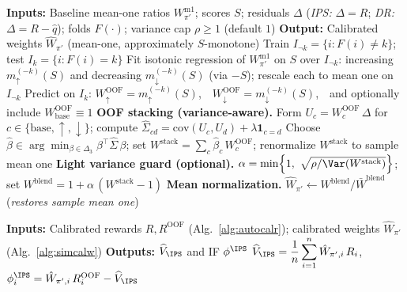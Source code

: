 \begin{algorithm}[t]
\caption{\textsc{Weight-Stabilization}: surrogate-indexed, unit-mean monotone calibration (OOF project $\to$ stack $\to$ cap $\to$ normalize)}
\label{alg:simcalw}
\begin{algorithmic}[1]
\STATE \textbf{Inputs:} Baseline mean-one ratios $W^{\mathrm{m1}}_{\pi'}$; scores $S$; residuals $\Delta$ (\emph{IPS:} $\Delta{=}R$; \emph{DR:} $\Delta{=}R-\hat q$); folds $F(\cdot)$; variance cap $\rho\!\ge\!1$ (default $1$)
\STATE \textbf{Output:} Calibrated weights $\hat W_{\pi'}$ (mean-one, approximately $S$-monotone)
  \STATE Train $I_{\neg k}=\{i:F(i)\neq k\}$; test $I_k=\{i:F(i)=k\}$ 
  \STATE Fit isotonic regression of $W^{\mathrm{m1}}_{\pi'}$ on $S$ over $I_{\neg k}$: increasing $m^{(-k)}_{\uparrow}(S)$ and decreasing $m^{(-k)}_{\downarrow}(S)$ (via $-S$); rescale each to mean one on $I_{\neg k}$
  \STATE Predict on $I_k$: $W^{\mathrm{OOF}}_{\uparrow}=m^{(-k)}_{\uparrow}(S)$,\ \ $W^{\mathrm{OOF}}_{\downarrow}=m^{(-k)}_{\downarrow}(S)$,\ \ and optionally include $W^{\mathrm{OOF}}_{\mathrm{base}}\equiv 1$
\ENDFOR
\STATE \textbf{OOF stacking (variance-aware).} Form $U_c=W^{\mathrm{OOF}}_c\,\Delta$ for $c\in\{\mathrm{base},\uparrow,\downarrow\}$; compute $\hat\Sigma_{cd}=\mathrm{cov}(U_c,U_d)+\lambda \mathbf{1}_{c=d}$
\STATE Choose $\hat\beta\in \arg\min_{\beta\in\Delta_3}\beta^\top \hat\Sigma\,\beta$; set $W^{\mathrm{stack}}=\sum_c \hat\beta_c\,W^{\mathrm{OOF}}_c$; renormalize $W^{\mathrm{stack}}$ to sample mean one
\STATE \textbf{Light variance guard (optional).} $\alpha = \min\!\left\{1,\ \sqrt{\rho/\Var(W^{\mathrm{stack}})}\right\}$; set $W^{\mathrm{blend}}=1+\alpha\,(W^{\mathrm{stack}}-1)$
\STATE \textbf{Mean normalization.} $\hat W_{\pi'} \leftarrow W^{\mathrm{blend}}/\bar W^{\mathrm{blend}}$ \hfill(\emph{restores sample mean one})
\end{algorithmic}
\end{algorithm}

\begin{algorithm}[t]
\caption{\textsc{Cal-IPS}: calibrated importance sampling}
\label{alg:calips}
\begin{algorithmic}[1]
\STATE \textbf{Inputs:} Calibrated rewards $R,R^{\mathrm{OOF}}$ (Alg.~\ref{alg:autocalr}); calibrated weights $\hat W_{\pi'}$ (Alg.~\ref{alg:simcalw})
\STATE \textbf{Outputs:} $\widehat V_{\IPS}$ and IF $\phi^{\IPS}$
\STATE $\displaystyle \widehat V_{\IPS}=\frac{1}{n}\sum_{i=1}^n \hat W_{\pi',i}\,R_i$, \quad $\phi^{\IPS}_i=\hat W_{\pi',i}\,R^{\mathrm{OOF}}_i-\widehat V_{\IPS}$
\end{algorithmic}
\end{algorithm}

